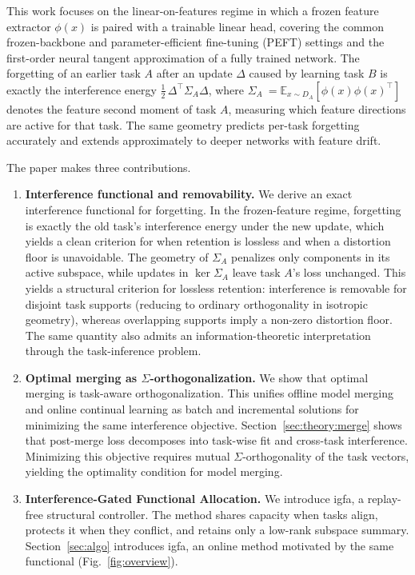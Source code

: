 \documentclass[10pt,a4paper]{article}
\theoremstyle{plain}
\theoremstyle{definition}
\newcommand{\Sig}{\Sigma}
\newcommand{\Del}{\Delta}
\newcommand{\IGFA}{igfa}
\begin{document}
This work focuses on the linear-on-features regime in which
a frozen feature extractor $\phi(x)$ is paired with a trainable linear head,
covering the common frozen-backbone and parameter-efficient fine-tuning
(PEFT) settings and the first-order neural tangent \cite{jacot2018} approximation of
a fully trained network.
The forgetting of an earlier task $A$ after an
update $\Del$ caused by learning task $B$
is exactly the interference energy
$\tfrac12\,\Del^\top\Sig_A\Del$, where $\Sig_A\ = \mathbb{E}_{x \sim D_A}\left[\phi(x)\phi(x)^\top\right]$ denotes the feature second moment of task
$A$, measuring which feature directions are active for that task.
The same geometry predicts per-task forgetting accurately and
extends approximately to deeper networks with feature drift.

The paper makes three contributions.
\begin{enumerate}[leftmargin=1.6em,itemsep=3pt]
\item \textbf{Interference functional and removability.}
We derive an exact interference functional for forgetting.
In the frozen-feature regime, forgetting is exactly the old task’s interference energy under the new update,
which yields a clean criterion for when retention is lossless and when a distortion floor is unavoidable.
The geometry of $\Sig_A$ penalizes only
components in its active subspace, while updates in $\ker \Sig_A$ leave task
$A$'s loss unchanged. This yields a structural criterion for lossless retention:
interference is removable for disjoint task supports (reducing to ordinary
orthogonality in isotropic geometry), whereas overlapping supports imply a
non-zero distortion floor. The same quantity also admits an
information-theoretic interpretation through the task-inference problem.

\item \textbf{Optimal merging as $\Sig$-orthogonalization.}
We show that optimal merging is task-aware orthogonalization.
This unifies offline model merging and online continual learning as batch and incremental solutions for minimizing the same interference objective.
Section~\ref{sec:theory:merge} shows that post-merge loss decomposes into
task-wise fit and cross-task interference. Minimizing this objective requires
mutual $\Sig$-orthogonality of the task vectors, yielding the optimality
condition for model merging.

\item \textbf{Interference-Gated Functional Allocation.}
We introduce igfa, a replay-free structural controller. The method shares capacity when tasks align, protects it when they conflict, and retains only a low-rank subspace summary.
Section~\ref{sec:algo} introduces \IGFA, an online method motivated by the same functional (Fig.~\ref{fig:overview}).
\end{enumerate}
\end{document}
